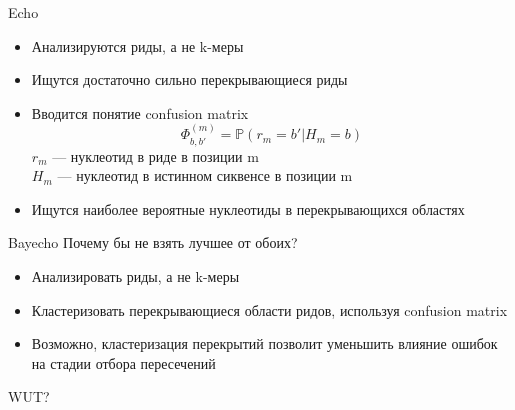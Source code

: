 \documentclass{beamer}
\begin{document}
\begin{frame}{Echo}
  \begin{itemize}
  \item Анализируются риды, а не k-меры
  \item Ищутся достаточно сильно перекрывающиеся риды
  \item Вводится понятие confusion matrix
    \begin{equation*}
      \Phi^{(m)}_{b,b'} = \mathds{P}(r_m = b' | H_m = b)
    \end{equation*}
    $r_m$ — нуклеотид в риде в позиции m\\
    $H_m$ — нуклеотид в истинном сиквенсе в позиции m
  \item Ищутся наиболее вероятные нуклеотиды в перекрывающихся областях
  \end{itemize}
\end{frame}

\begin{frame}{Bayecho}
  Почему бы не взять лучшее от обоих?
  \begin{itemize}
  \item Анализировать риды, а не k-меры
  \item Кластеризовать перекрывающиеся области ридов, используя confusion matrix
  \item Возможно, кластеризация перекрытий позволит уменьшить влияние ошибок на стадии отбора пересечений
  \end{itemize}
\end{frame}

\begin{frame}{ }
  \begin{center}
    WUT?
  \end{center}
\end{frame}
\end{document}
